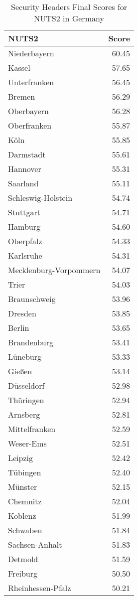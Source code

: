 
    \begin{table}[ht]
        \centering
        \caption{Security Headers Final Scores for NUTS2 in Germany}
        \label{tab:final_grades_sh_de}
        \begin{tabular}{lr}
            \toprule
            \textbf{NUTS2} & \textbf{Score} \\
            \midrule
            Niederbayern & 60.45 \\
            Kassel & 57.65 \\
            Unterfranken & 56.45 \\
            Bremen & 56.29 \\
            Oberbayern & 56.28 \\
            Oberfranken & 55.87 \\
            Köln & 55.85 \\
            Darmstadt & 55.61 \\
            Hannover & 55.31 \\
            Saarland & 55.11 \\
            Schleswig-Holstein & 54.74 \\
            Stuttgart & 54.71 \\
            Hamburg & 54.60 \\
            Oberpfalz & 54.33 \\
            Karlsruhe & 54.31 \\
            Mecklenburg-Vorpommern & 54.07 \\
            Trier & 54.03 \\
            Braunschweig & 53.96 \\
            Dresden & 53.85 \\
            Berlin & 53.65 \\
            Brandenburg & 53.41 \\
            Lüneburg & 53.33 \\
            Gießen & 53.14 \\
            Düsseldorf & 52.98 \\
            Thüringen & 52.94 \\
            Arnsberg & 52.81 \\
            Mittelfranken & 52.59 \\
            Weser-Ems & 52.51 \\
            Leipzig & 52.42 \\
            Tübingen & 52.40 \\
            Münster & 52.15 \\
            Chemnitz & 52.04 \\
            Koblenz & 51.99 \\
            Schwaben & 51.84 \\
            Sachsen-Anhalt & 51.83 \\
            Detmold & 51.59 \\
            Freiburg & 50.50 \\
            Rheinhessen-Pfalz & 50.21 \\
            \bottomrule
        \end{tabular}
    \end{table}
    